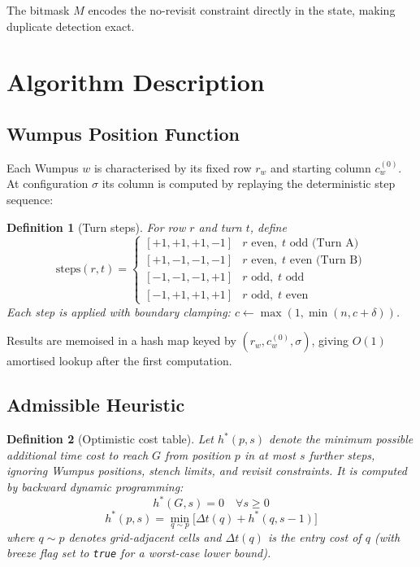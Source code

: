 \documentclass[12pt,a4paper]{article}
\newtheorem{definition}{Definition}
\begin{document}
The bitmask $M$ encodes the no-revisit constraint directly in the state,
making duplicate detection exact.

\section{Algorithm Description}

\subsection{Wumpus Position Function}

Each Wumpus $w$ is characterised by its fixed row $r_w$ and starting column
$c_w^{(0)}$.  At configuration $\sigma$ its column is computed by replaying
the deterministic step sequence:

\begin{definition}[Turn steps]
For row $r$ and turn $t$, define
\[
  \text{steps}(r, t) =
  \begin{cases}
    [+1,+1,+1,-1] & r \text{ even},\; t \text{ odd (Turn A)} \\
    [+1,-1,-1,-1] & r \text{ even},\; t \text{ even (Turn B)} \\
    [-1,-1,-1,+1] & r \text{ odd},\; t \text{ odd} \\
    [-1,+1,+1,+1] & r \text{ odd},\; t \text{ even}
  \end{cases}
\]
Each step is applied with boundary clamping: $c \leftarrow \max(1,\min(n,c+\delta))$.
\end{definition}

Results are memoised in a hash map keyed by $(r_w, c_w^{(0)}, \sigma)$,
giving $O(1)$ amortised lookup after the first computation.

\subsection{Admissible Heuristic}
\label{sec:heuristic}

\begin{definition}[Optimistic cost table]
Let $h^*(p, s)$ denote the minimum possible additional time cost to reach $G$
from position $p$ in at most $s$ further steps, \emph{ignoring} Wumpus
positions, stench limits, and revisit constraints.  It is computed by
backward dynamic programming:
\[
  h^*(G, s) = 0 \quad \forall s \ge 0
\]
\[
  h^*(p, s) = \min_{q \sim p}\bigl[\Delta t(q) + h^*(q, s-1)\bigr]
\]
where $q \sim p$ denotes grid-adjacent cells and $\Delta t(q)$ is the
entry cost of $q$ (with breeze flag set to \texttt{true} for a worst-case
lower bound).
\end{definition}
\end{document}
